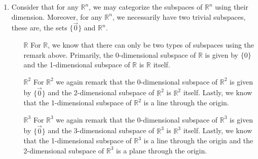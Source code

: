     \begin{enumerate}
        \item Consider that for any $\mathbb{R}^n$, we may categorize the subspaces of $\mathbb{R}^n$ using their dimension. Moreover, for any $\mathbb{R}^n$, we necessarily have two trivial subspaces, these are, the sets $\{\vec 0\}$ and $\mathbb{R}^n$. 
        \begin{itemize}
            \item[$\mathbb{R}$]
            For $\mathbb{R}$, we know that there can only be two types of subspaces using the remark above. Primarily, the 0-dimensional subspace of $\mathbb{R}$ is given by $\{0\}$ and the 1-dimensional subspace of $\mathbb{R}$ is $\mathbb{R}$ itself. 
            \item[$\mathbb{R}^2$]
            For $\mathbb{R}^2$ we again remark that the 0-dimensional subspace of $\mathbb{R}^2$ is given by $\{\vec 0\}$ and the 2-dimensional subspace of $\mathbb{R}^2$ is $\mathbb{R}^2$ itself. Lastly, we know that the 1-dimensional subspace of $\mathbb{R}^2$ is a line through the origin. 
            \item[$\mathbb{R}^3$]
            For $\mathbb{R}^3$ we again remark that the 0-dimensional subspace of $\mathbb{R}^3$ is given by $\{\vec 0\}$ and the 3-dimensional subspace of $\mathbb{R}^3$ is $\mathbb{R}^3$ itself. Lastly, we know that the 1-dimensional subspace of $\mathbb{R}^3$ is a line through the origin and the 2-dimensional subspace of $\mathbb{R}^3$ is a plane through the origin.

\end{itemize}
\end{enumerate}
\end{SaveQuestion}

